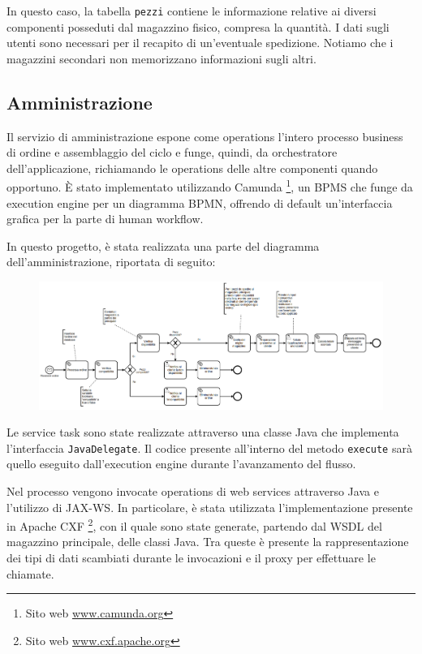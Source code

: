 \documentclass[twoside]{article}
\begin{document}
In questo caso, la tabella \texttt{pezzi} contiene le informazione relative ai diversi
componenti posseduti dal magazzino fisico, compresa la quantità. I dati sugli utenti sono
necessari per il recapito di un'eventuale spedizione. Notiamo che i magazzini secondari
non memorizzano informazioni sugli altri.

\subsection{Amministrazione}
Il servizio di amministrazione espone come operations l'intero processo business di ordine
e assemblaggio del ciclo e funge, quindi, da orchestratore dell'applicazione, richiamando
le operations delle altre componenti quando opportuno. \`E stato implementato utilizzando Camunda
\footnote{Sito web \url{www.camunda.org}}, un BPMS che funge da execution engine per un
diagramma BPMN, offrendo di default un'interfaccia grafica per la parte di human workflow.

In questo progetto, è stata realizzata una parte del diagramma dell'amministrazione,
riportata di seguito:

\begin{figure}[!htbp]
\centering
\includegraphics[width=17cm]{screen-bpmn-camunda.png}
\label{fig:bpmn}
\end{figure}

Le service task sono state realizzate attraverso una classe Java che implementa l'interfaccia
\texttt{JavaDelegate}. Il codice presente all'interno del metodo \texttt{execute} sarà quello
eseguito dall'execution engine durante l'avanzamento del flusso.

Nel processo vengono invocate operations di web services attraverso Java e l'utilizzo di JAX-WS.
In particolare, è stata utilizzata l'implementazione presente in Apache CXF
\footnote{Sito web \url{www.cxf.apache.org}}, con il quale sono state generate, partendo dal WSDL
del magazzino principale, delle classi Java. Tra queste è presente la rappresentazione
dei tipi di dati scambiati durante le invocazioni e il proxy per effettuare le chiamate.
\end{document}

